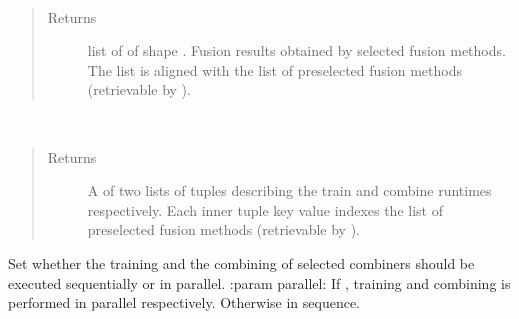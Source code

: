 \documentclass[letterpaper,10pt,english]{sphinxmanual}
\begin{document}
\begin{fulllineitems}
\begin{fulllineitems}
\label{\detokenize{pusion.auto.generic_combiner:pusion.auto.generic_combiner.GenericCombiner.get_multi_combiner_decision_tensor}}~\begin{quote}\begin{description}
\item[{Returns}] \leavevmode
\sphinxAtStartPar
list of  of shape .
Fusion results obtained by selected fusion methods.
The list is aligned with the list of preselected fusion methods (retrievable by ).

\end{description}\end{quote}

\end{fulllineitems}


\begin{fulllineitems}
\label{\detokenize{pusion.auto.generic_combiner:pusion.auto.generic_combiner.GenericCombiner.get_multi_combiner_runtimes}}~\begin{quote}\begin{description}
\item[{Returns}] \leavevmode
\sphinxAtStartPar
A  of two lists of tuples describing the train and combine runtimes respectively.
Each inner tuple key value indexes the list of preselected fusion methods
(retrievable by ).

\end{description}\end{quote}

\end{fulllineitems}


\begin{fulllineitems}
\label{\detokenize{pusion.auto.generic_combiner:pusion.auto.generic_combiner.GenericCombiner.set_parallel}}
\sphinxAtStartPar
Set whether the training and the combining of selected combiners should be executed sequentially or in parallel.
:param parallel: If , training and combining is performed in parallel respectively. Otherwise in sequence.

\end{fulllineitems}


\end{fulllineitems}
\end{document}
